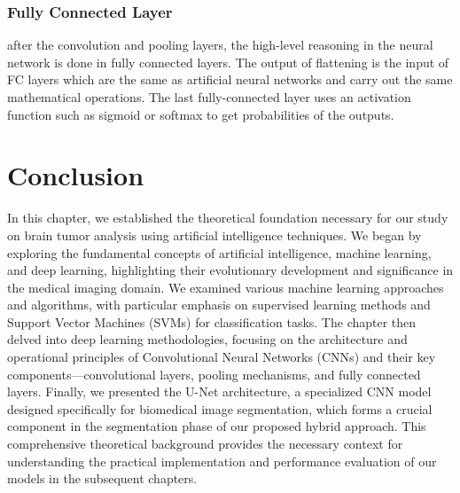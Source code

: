 \subsubsection{Fully Connected Layer}

after the convolution and pooling layers, the high-level reasoning in the neural network is done in fully connected layers. The output of flattening is the input of FC layers which are the same as artificial neural networks and carry out the same mathematical operations. The last fully-connected layer uses an activation function such as sigmoid or softmax to get probabilities of the outputs.



\section{Conclusion}
\label{sec:conclusion}

In this chapter, we established the theoretical foundation necessary for our study on brain tumor analysis using artificial intelligence techniques. We began by exploring the fundamental concepts of artificial intelligence, machine learning, and deep learning, highlighting their evolutionary development and significance in the medical imaging domain. We examined various machine learning approaches and algorithms, with particular emphasis on supervised learning methods and Support Vector Machines (SVMs) for classification tasks. The chapter then delved into deep learning methodologies, focusing on the architecture and operational principles of Convolutional Neural Networks (CNNs) and their key components—convolutional layers, pooling mechanisms, and fully connected layers. Finally, we presented the U-Net architecture, a specialized CNN model designed specifically for biomedical image segmentation, which forms a crucial component in the segmentation phase of our proposed hybrid approach. This comprehensive theoretical background provides the necessary context for understanding the practical implementation and performance evaluation of our models in the subsequent chapters.
